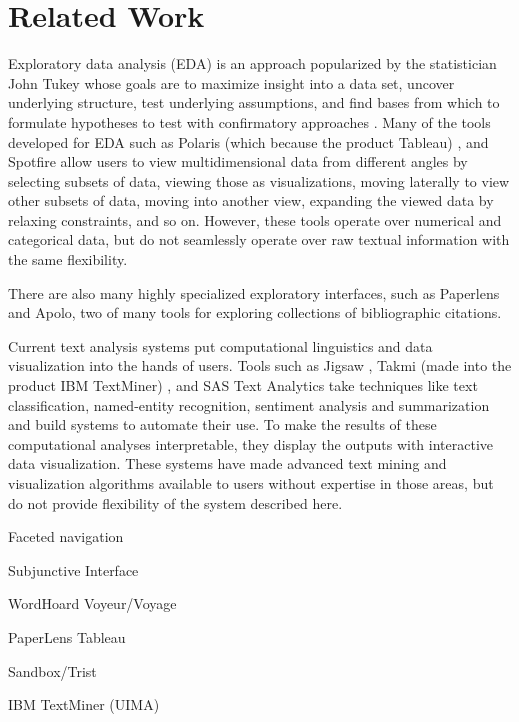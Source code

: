 




\section{Related Work}

Exploratory data analysis  (EDA) is an approach popularized by the statistician John Tukey whose goals are to maximize insight into a data set, uncover underlying structure, test underlying assumptions, and find bases from which to formulate hypotheses to test with confirmatory approaches \cite{turkey1977exploratory,tukey1980we}.  Many of the tools developed for EDA such as Polaris (which because the product Tableau) \cite{stotle2002polaris}, and Spotfire \cite{ahlberg1996spotfire} allow users to view multidimensional data from different angles by selecting subsets of data, viewing those as visualizations, moving laterally to view other subsets of data, moving into another view, expanding the viewed data by relaxing constraints, and so on.  However, these tools operate over numerical and categorical data, but do not seamlessly operate over raw textual information with the same flexibility. 

There are also many highly specialized exploratory interfaces, such as Paperlens \cite{} and Apolo, two  of many tools for exploring collections of bibliographic citations.

Current text analysis systems put computational linguistics and data visualization into the hands of users. Tools such as Jigsaw \cite{stasko2008jigsaw},  Takmi (made into the product IBM TextMiner) \cite{uramoto2004text}, and SAS Text Analytics \cite{} take techniques like text classification, named-entity recognition, sentiment analysis and summarization and build systems to automate their use. To make the results of these computational analyses interpretable, they display the outputs with interactive data visualization. These systems have made advanced text mining and visualization algorithms available to users without expertise in those areas, but do not provide flexibility of  the system described here.



Faceted navigation

Subjunctive Interface

WordHoard
Voyeur/Voyage

PaperLens
Tableau

Sandbox/Trist

IBM TextMiner (UIMA)

